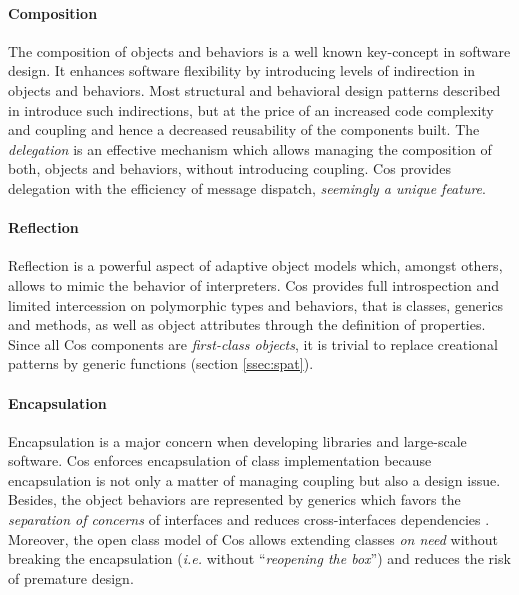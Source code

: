 \documentclass[preprint,10pt]{sigplanconf}
\newcommand{\abbrev}[1]{{\em #1}\xspace}
\newcommand{\ie}{\abbrev{i.e.}}
\newcommand{\ProgLang}[1]{{\sc #1}\xspace}
\newcommand{\Cos}       {\ProgLang{Cos}}
\begin{document}
\paragraph{Composition}

The composition of objects and behaviors is a well known key-concept in software design. It enhances software flexibility by introducing levels of indirection in objects and behaviors. Most structural and behavioral design patterns described in \cite{gof95} introduce such indirections, but at the price of an increased code complexity and coupling and hence a decreased reusability of the components built. The {\em delegation} is an effective mechanism which allows managing the composition of both, objects and behaviors, without introducing coupling. \Cos provides delegation with the efficiency of message dispatch, {\em seemingly a unique feature}.

\paragraph{Reflection}

Reflection is a powerful aspect of adaptive object models which, amongst others, allows to mimic the behavior of interpreters. \Cos provides full introspection and limited intercession on polymorphic types and behaviors, that is classes, generics and methods, as well as object attributes through the definition of properties. Since all \Cos components are {\em first-class objects}, it is trivial to replace creational patterns \cite{gof95} by generic functions (section \ref{ssec:spat}).


\paragraph{Encapsulation}

Encapsulation is a major concern when developing libraries and large-scale software. \Cos enforces encapsulation of class implementation because encapsulation is not only a matter of managing coupling but also a design issue. Besides, the object behaviors are represented by generics which favors the {\em separation of concerns} of interfaces and reduces cross-interfaces dependencies \cite{bos01}. Moreover, the open class model of \Cos allows extending classes {\em on need} without breaking the encapsulation (\ie without ``{\em reopening the box}'') and reduces the risk  of premature design.
\end{document}
